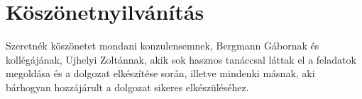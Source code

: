 \chapter*{Köszönetnyilvánítás}%

Szeretnék köszönetet mondani konzulensemnek, Bergmann Gábornak és kollégájának, Ujhelyi Zoltánnak, akik sok hasznos tanáccsal láttak el a feladatok megoldása és a dolgozat elkészítése során, illetve mindenki másnak, aki bárhogyan hozzájárult a dolgozat sikeres elkészüléséhez.